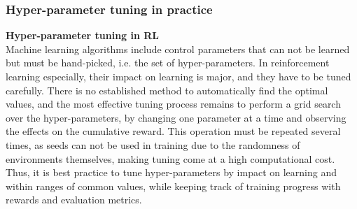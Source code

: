 \subsubsection{Hyper-parameter tuning in practice} \label{basics}

\textbf{Hyper-parameter tuning in RL} \\
Machine learning algorithms include control parameters that can not be learned but must be hand-picked, i.e. the set of hyper-parameters. In reinforcement learning especially, their impact on learning is major, and they have to be tuned carefully. There is no established method to automatically find the optimal values, and the most effective tuning process remains to perform a grid search over the hyper-parameters, by changing one parameter at a time and observing the effects on the cumulative reward. This operation must be repeated several times, as seeds can not be used in training due to the randomness of environments themselves, making tuning come at a high computational cost. Thus, it is best practice to tune hyper-parameters by impact on learning and within ranges of common values, while keeping track of training progress with rewards and evaluation metrics. \\

